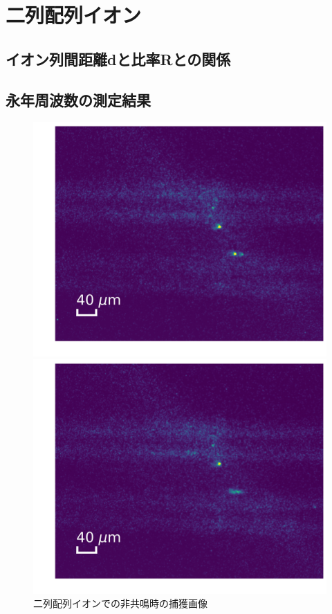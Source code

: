 %
\clearpage
%
\section{二列配列イオン}
\subsection{イオン列間距離dと比率Rとの関係}
\subsection{永年周波数の測定結果}

\begin{figure}[h]
	\begin{minipage}{0.5\linewidth}
		\begin{center}
			\includegraphics[width = 0.98\columnwidth]{./results/figure/2D_off_resonance.jpg}
			\caption{二列配列イオンでの非共鳴時の捕獲画像}
			\label{fig:2D_off_resonance}
		\end{center}
	\end{minipage}
	\begin{minipage}{0.5\linewidth}
		\begin{center}
			\includegraphics[width = 0.98\columnwidth]{./results/figure/2D_resonance.jpg}

\end{center}
\end{minipage}
\end{figure}
